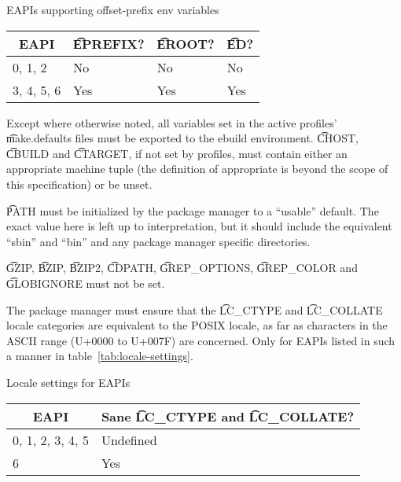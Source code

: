\begin{centertable}{EAPIs supporting offset-prefix env variables}
    \label{tab:offset-env-vars-table}
    \begin{tabular}{llll}
      \toprule
      \multicolumn{1}{c}{\textbf{EAPI}} &
      \multicolumn{1}{c}{\textbf{\t{EPREFIX}?}} &
      \multicolumn{1}{c}{\textbf{\t{EROOT}?}} &
      \multicolumn{1}{c}{\textbf{\t{ED}?}} \\
      \midrule
      0, 1, 2           & No  & No  & No  \\
      3, 4, 5, 6        & Yes & Yes & Yes \\
      \bottomrule
    \end{tabular}
\end{centertable}

Except where otherwise noted, all variables set in the active profiles' \t{make.defaults} files must
be exported to the ebuild environment. \t{CHOST}, \t{CBUILD} and \t{CTARGET}, if not set by
profiles, must contain either an appropriate machine tuple (the definition of appropriate is beyond
the scope of this specification) or be unset.

\t{PATH} must be initialized by the package manager to a ``usable'' default.  The exact value here
is left up to interpretation, but it should include the equivalent ``sbin'' and ``bin'' and any
package manager specific directories.

\t{GZIP}, \t{BZIP}, \t{BZIP2}, \t{CDPATH}, \t{GREP\_OPTIONS}, \t{GREP\_COLOR} and \t{GLOBIGNORE}
must not be set.

 The package manager must ensure that the \t{LC\_CTYPE} and
\t{LC\_COLLATE} locale categories are equivalent to the POSIX locale, as far as characters in the
ASCII range (U+0000 to U+007F) are concerned. Only for EAPIs listed in such a manner in
table~\ref{tab:locale-settings}.

\begin{centertable}{Locale settings for EAPIs}
    \label{tab:locale-settings}
    \begin{tabular}{ll}
      \toprule
      \multicolumn{1}{c}{\textbf{EAPI}} &
      \multicolumn{1}{c}{\textbf{Sane \t{LC\_CTYPE} and \t{LC\_COLLATE}?}} \\
      \midrule
      0, 1, 2, 3, 4, 5  & Undefined \\
      6                 & Yes       \\
      \bottomrule
    \end{tabular}
\end{centertable}

